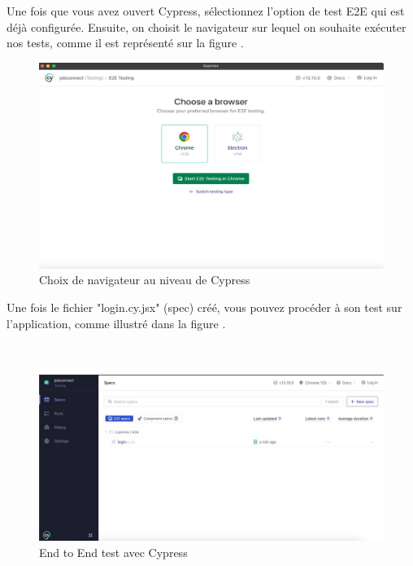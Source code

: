 Une fois que vous avez ouvert Cypress, sélectionnez l’option de test E2E qui est déjà configurée. Ensuite, on choisit le navigateur sur 
lequel on souhaite exécuter nos tests, comme il est représenté sur la figure \cite{fig:cy2}.
\\

\begin{figure}[htbp]
   \centering
   \includegraphics[scale=0.4]{cypress/3.jpg} 
   \caption{Choix de navigateur au niveau de Cypress}
   \label{fig:cy2}
\end{figure}

Une fois le fichier "login.cy.jsx" (spec) créé, vous pouvez procéder à son test sur l'application, comme illustré dans la figure \cite{cy3}.
\\
\\
\\

\begin{figure}[htbp]
   \centering
   \includegraphics[scale=0.4]{cypress/4.jpg} 
   \caption{ End to End test avec Cypress}
   \label{fig:cy3}
\end{figure}

